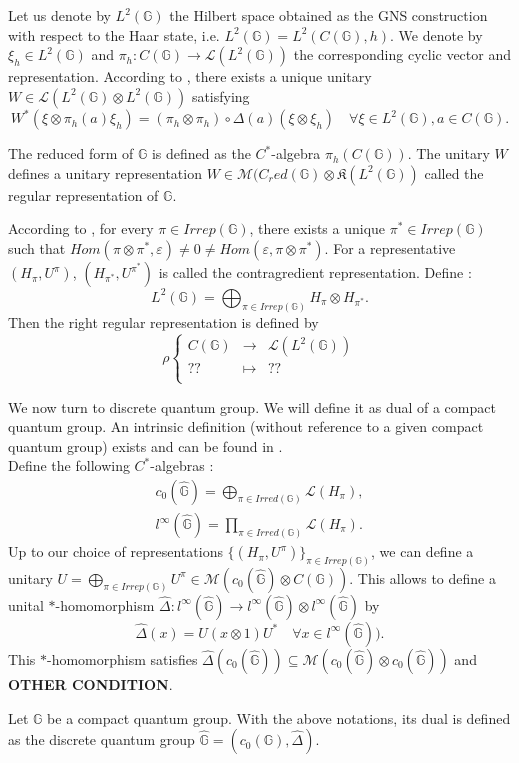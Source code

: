 Let us denote by $L^2(\mathbb G)$ the Hilbert space obtained as the GNS construction with respect to the Haar state, i.e. $L^2(\mathbb G) = L^2(C(\mathbb G),h)$. We denote by $\xi_h\in L^2(\mathbb G)$ and $\pi_h : C(\mathbb G)\rightarrow \mathcal L(L^2(\mathbb G))$ the corresponding cyclic vector and representation. According to \cite{Wo}, there exists a unique unitary $W\in \mathcal L(L^2(\mathbb G) \otimes L^2(\mathbb G) )$ satisfying 
\[W^*(\xi\otimes \pi_h(a)\xi_h ) = (\pi_h\otimes\pi_h)\circ \Delta(a)(\xi\otimes \xi_h)\quad \forall \xi\in L^2(\mathbb G),a\in C(\mathbb G).\] 
\begin{definition}
The reduced form of $\mathbb G$ is defined as the $C^*$-algebra $\pi_h(C(\mathbb G))$. The unitary $W$ defines a unitary representation $W\in\mathcal M(C_red(\mathbb G)\otimes \mathfrak K(L^2(\mathbb G))$ called the regular representation of $\mathbb G$.
\end{definition}

According to \cite{Wo}, for every $\pi\in Irrep(\mathbb G)$, there exists a unique $\pi^*\in Irrep(\mathbb G)$ such that $Hom(\pi\otimes \pi^*,\varepsilon)\neq 0 \neq Hom(\varepsilon,\pi\otimes \pi^*) $. For a representative $(H_\pi,U^\pi)$, $(H_{\pi^*},U^{\pi^*})$ is called the contragredient representation. Define :
\[L^2(\mathbb G) = \bigoplus_{\pi\in Irrep(\mathbb G)} H_\pi \otimes H_{\pi^*}. \]
Then the right regular representation is defined by
\[\rho\left\{\begin{array}{rcl}
C(\mathbb G) & \rightarrow & \mathcal L(L^2(\mathbb G)) \\
??	& \mapsto & ??\\
\end{array}\right.\]

We now turn to discrete quantum group. We will define it as dual of a compact quantum group. An intrinsic definition (without reference to a given compact quantum group) exists and can be found in \cite{vandaele}.\\

Define the following $C^*$-algebras :
\[\begin{array}{c}
c_0(\hat{\mathbb G})= \bigoplus_{\pi\in Irred(\mathbb G)} \mathcal L(H_\pi),\\
l^\infty(\hat{\mathbb G})= \prod_{\pi\in Irred(\mathbb G)} \mathcal L(H_\pi).
\end{array}\]
Up to our choice of representations $\{(H_\pi,U^\pi)\}_{\pi\in Irrep(\mathbb G)}$, we can define a unitary $U = \bigoplus_{\pi\in Irrep(\mathbb G)} U^\pi\in \mathcal M(c_0(\hat{\mathbb G}) \otimes C(\mathbb G))$. This allows to define a unital $*$-homomorphism $\hat \Delta : l^\infty(\hat{\mathbb G}) \rightarrow l^\infty(\hat{\mathbb G})\otimes l^\infty(\hat{\mathbb G})$ by 
\[\hat\Delta ( x) = U(x \otimes 1)U^*\quad \forall x\in l^\infty(\hat{\mathbb G})).\]
This $*$-homomorphism satisfies $\hat\Delta(c_0(\hat{\mathbb G}))\subseteq \mathcal M(c_0(\hat{\mathbb G})\otimes c_0(\hat{\mathbb G}))$ and \textbf{OTHER CONDITION}.
\begin{definition}
Let $\mathbb G$ be a compact quantum group. With the above notations, its dual is defined as the discrete quantum group $\hat{\mathbb G} = (c_0(\mathbb G),\hat\Delta)$.
\end{definition}

